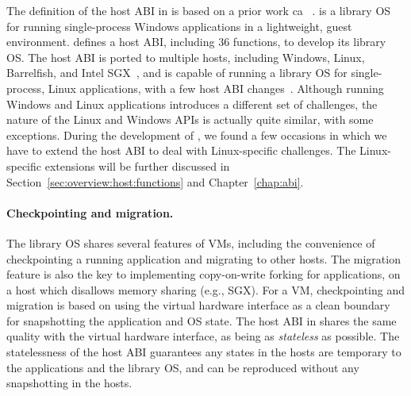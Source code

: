 The definition of the host ABI in \graphene{} is based on a prior work ca
\drawbridge{}~\cite{porter11drawbridge}.
\drawbridge{} is a library OS for running single-process Windows applications
in a lightweight, guest environment.
\drawbridge{} 
defines a host ABI, including 36 functions, to develop its library OS.
The \drawbridge{} host ABI
is ported to multiple hosts, including Windows, Linux, Barrelfish, and Intel SGX~\cite{porter11drawbridge,baumann14haven,mssql-on-linux,baumann13bascule},
and is capable of running a library OS for single-process, Linux applications, with a few host ABI changes~\cite{baumann13bascule}.
Although running Windows and Linux applications introduces
a different set of challenges,
the nature of the Linux and Windows APIs is actually quite similar, with some exceptions.
During the development of \graphene{}, we found a few occasions in which we have to extend the host ABI to deal with Linux-specific challenges. The Linux-specific extensions will be further discussed in Section~\ref{sec:overview:host:functions} and Chapter~\ref{chap:abi}.


\paragraph{Checkpointing and migration.}
The \graphene{} library OS shares several features of VMs, including the convenience of checkpointing a running application and migrating to other hosts.
The migration feature is also the key to implementing copy-on-write forking for applications,
on a host which disallows memory sharing (e.g., SGX).
For a VM, checkpointing and migration is based on using the virtual hardware interface as a clean boundary for snapshotting the application and OS state.
The host ABI in \graphene{} shares the same quality with the virtual hardware interface,
as being as {\em stateless} as possible.
The statelessness of the host ABI guarantees any states in the hosts are temporary to the applications and the library OS, and can be reproduced without any snapshotting in the hosts.





